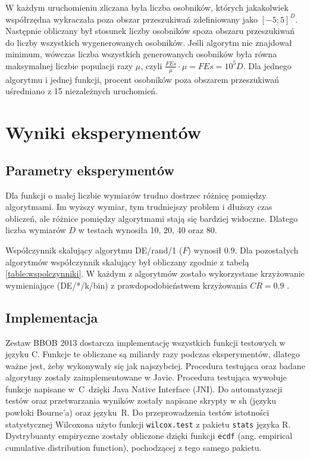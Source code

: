 \documentclass[a4paper,onecolumn,oneside,12pt,wide,floatssmall]{mwrep}
\theoremstyle{definition}
\theoremstyle{plain}%
\theoremstyle{remark}
\begin{document}
W każdym uruchomieniu zliczana była liczba osobników, których jakakolwiek współrzędna wykraczała poza
obszar przeszukiwań zdefiniowany jako $[-5; 5]^D$. Następnie obliczany był stosunek liczby 
osobników spoza obszaru przeszukiwań do liczby wszystkich wygenerowanych osobników. Jeśli algorytm
nie znajdował minimum, wówczas liczba wszystkich generowanych osobników była równa maksymalnej liczbie
populacji razy $\mu$, czyli $\frac{FEs}{\mu} \cdot \mu = FEs = 10^5D$. 
Dla jednego algorytmu i jednej funkcji, procent osobników
poza obszarem przeszukiwań uśredniano z 15 niezależnych uruchomień.



\chapter{Wyniki eksperymentów}

\section{Parametry eksperymentów}

Dla funkcji o małej liczbie wymiarów trudno dostrzec różnicę pomiędzy algorytmami. Im wyższy wymiar,
tym trudniejszy problem i dłuższy czas obliczeń, ale różnice pomiędzy algorytmami stają się bardziej 
widoczne. Dlatego liczba wymiarów $D$ w testach wynosiła 10, 20, 40 oraz 80. 

Współczynnik skalujący algorytmu DE/rand/1 ($F$) wynosił $0.9$. 
Dla pozostałych algorytmów współczynnik skalujący był obliczany zgodnie z tabelą
\ref{table:wspolczynniki}.
W każdym z algorytmów zostało wykorzystane krzyżowanie wymieniające (DE/*/k/bin) z
prawdopodobieństwem krzyżowania $CR = 0.9$ \cite{ronkkonen}.

\section{Implementacja}

Zestaw BBOB 2013 dostarcza implementację wszystkich funkcji testowych w języku C. Funkcje te obliczane
są miliardy razy podczas eksperymentów, dlatego ważne jest, żeby wykonywały się jak najszybciej.
Procedura testująca oraz badane algorytmy zostały zaimplementowane w 
Javie. Procedura testująca wywołuje funkcje napisane w~C~dzięki Java Native Interface (JNI).
Do automatyzacji testów oraz przetwarzania wyników zostały napisane skrypty w sh 
(języku powłoki Bourne'a) oraz języku~R. Do przeprowadzenia testów istotności statystycznej Wilcoxona 
użyto funkcji \texttt{wilcox.test} z pakietu \texttt{stats} języka R. Dystrybuanty empiryczne
zostały obliczone dzięki funkcji \texttt{ecdf} (ang. empirical cumulative distribution function),
pochodzącej z tego samego pakietu.
\end{document}
